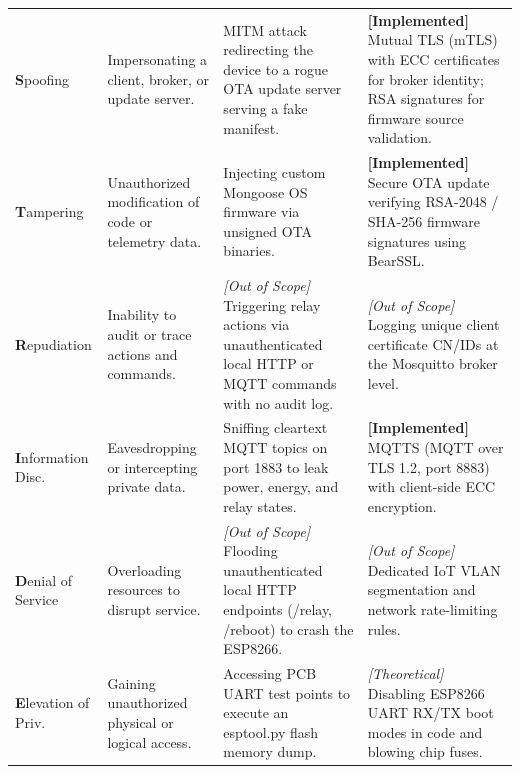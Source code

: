 \begin{longtable}{>{\raggedright\arraybackslash}p{} >{\raggedright\arraybackslash}p{} >{\raggedright\arraybackslash}p{} >{\raggedright\arraybackslash}p{}}
\rowcolor{lightgray}
\textbf{S}poofing & Impersonating a client, broker, or update server. & [\textbf{Implemented}] MITM attack redirecting the device to a rogue OTA update server serving a fake manifest. & \textbf{[Implemented]} Mutual TLS (mTLS) with ECC certificates for broker identity; RSA signatures for firmware source validation. \\
\addlinespace
\textbf{T}ampering & Unauthorized modification of code or telemetry data. & [\textbf{Implemented}] Injecting custom Mongoose OS firmware via unsigned OTA binaries. & \textbf{[Implemented]} Secure OTA update verifying RSA-2048 / SHA-256 firmware signatures using BearSSL. \\
\addlinespace
\rowcolor{lightgray}
\textbf{R}epudiation & Inability to audit or trace actions and commands. & \textit{[Out of Scope]} Triggering relay actions via unauthenticated local HTTP or MQTT commands with no audit log. & \textit{[Out of Scope]} Logging unique client certificate CN/IDs at the Mosquitto broker level. \\
\addlinespace
\textbf{I}nformation Disc. & Eavesdropping or intercepting private data. & [\textbf{Implemented}] Sniffing cleartext MQTT topics on port 1883 to leak power, energy, and relay states. & \textbf{[Implemented]} MQTTS (MQTT over TLS 1.2, port 8883) with client-side ECC encryption. \\
\addlinespace
\rowcolor{lightgray}
\textbf{D}enial of Service & Overloading resources to disrupt service. & \textit{[Out of Scope]} Flooding unauthenticated local HTTP endpoints (/relay, /reboot) to crash the ESP8266. & \textit{[Out of Scope]} Dedicated IoT VLAN segmentation and network rate-limiting rules. \\
\addlinespace
\textbf{E}levation of Priv. & Gaining unauthorized physical or logical access. & [\textbf{Implemented}] Accessing PCB UART test points to execute an esptool.py flash memory dump. & \textit{[Theoretical]} Disabling ESP8266 UART RX/TX boot modes in code and blowing chip fuses. \\
\end{longtable}
\endgroup

